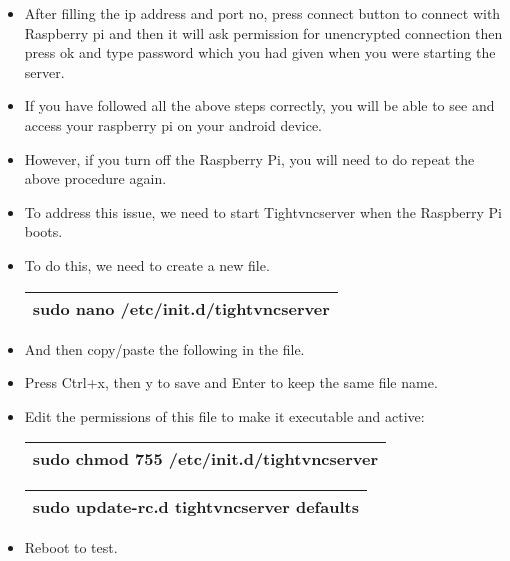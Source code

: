 \documentclass[journal,12pt,onecolumn]{IEEEtran}
\begin{document}
\begin{itemize}
\item After filling the ip address and port no, press connect button to connect with Raspberry pi and then it will ask permission for unencrypted connection then press ok and type password which you had given when you were starting the server.

\item If you have followed all the above steps correctly, you will be able to see and access your raspberry pi on your android device.

\item However, if you turn off the Raspberry Pi, you will need to do repeat the above procedure again.

\item  To address this issue, we need to start Tightvncserver when the Raspberry Pi boots.

\item To do this, we need to create a new file. 

\begin{table}[ht]
	\centering %
	\begin{tabular}{| c |} %
		\hline %
 			sudo nano /etc/init.d/tightvncserver \\
		\hline
	\end{tabular}
	\centering
\end{table}
 
\item And then copy/paste  the following in the  file.



\item Press Ctrl+x, then y to save and Enter to keep the same file name.

\item Edit the permissions of this file to make it executable and active:

\begin{table}[ht]
	\centering %
	\begin{tabular}{| c |} %
		\hline %
 			sudo chmod 755 /etc/init.d/tightvncserver \\
		\hline
	\end{tabular}
	\centering
\end{table}

\begin{table}[ht]
	\centering %
	\begin{tabular}{| c |} %
		\hline %
 			sudo update-rc.d tightvncserver defaults
 \\
		\hline
	\end{tabular}
	\centering
\end{table}
 
\item  Reboot to test.

\end{itemize}
\end{document}
